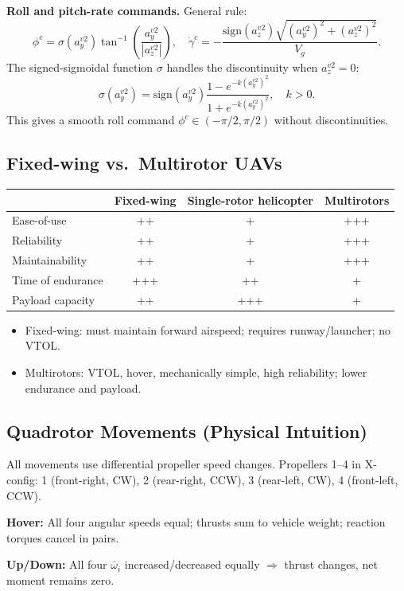 \documentclass[11pt,a4paper]{article}
\begin{document}
\textbf{Roll and pitch-rate commands.}
General rule:
\[
\phi^c = \sigma(a_y^{v2})\tan^{-1}\!\!\left(\frac{a_y^{v2}}{|a_z^{v2}|}\right),
\quad
\dot\gamma^c = -\frac{\mathrm{sign}(a_z^{v2})\sqrt{(a_y^{v2})^2+(a_z^{v2})^2}}{V_g}.
\]
The signed-sigmoidal function $\sigma$ handles the discontinuity when $a_z^{v2}=0$:
\[
\sigma(a_y^{v2}) = \mathrm{sign}(a_y^{v2})\frac{1-e^{-k(a_y^{v2})^2}}{1+e^{-k(a_y^{v2})^2}},\quad k>0.
\]
This gives a smooth roll command $\phi^c \in (-\pi/2,\pi/2)$ without discontinuities.

\subsection{Fixed-wing vs.\ Multirotor UAVs}

\begin{center}
\begin{tabular}{lccc}
\toprule
 & Fixed-wing & Single-rotor helicopter & Multirotors \\
\midrule
Ease-of-use & ++ & + & +++ \\
Reliability & ++ & + & +++ \\
Maintainability & ++ & + & +++ \\
Time of endurance & +++ & ++ & + \\
Payload capacity & ++ & +++ & + \\
\bottomrule
\end{tabular}
\end{center}

\begin{itemize}
  \item Fixed-wing: must maintain forward airspeed; requires runway/launcher; no VTOL.
  \item Multirotors: VTOL, hover, mechanically simple, high reliability; lower endurance and payload.
\end{itemize}

\subsection{Quadrotor Movements (Physical Intuition)}

All movements use differential propeller speed changes. Propellers 1--4 in X-config: 1 (front-right, CW), 2 (rear-right, CCW), 3 (rear-left, CW), 4 (front-left, CCW).

\textbf{Hover:} All four angular speeds equal; thrusts sum to vehicle weight; reaction torques cancel in pairs.

\textbf{Up/Down:} All four $\bar\omega_i$ increased/decreased equally $\Rightarrow$ thrust changes, net moment remains zero.
\end{document}

